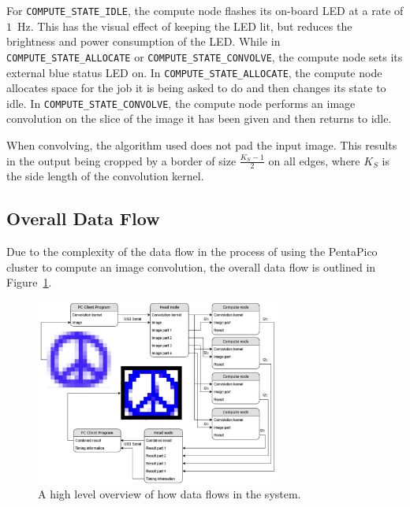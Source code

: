 \documentclass[conference]{IEEEtran}
\begin{document}
For \texttt{COMPUTE\_STATE\_IDLE}, the compute node flashes its on-board LED at a rate of $1$~Hz. This has the visual effect of keeping the LED lit, but reduces the brightness and power consumption of the LED.
While in \texttt{COMPUTE\_STATE\_ALLOCATE} or \texttt{COMPUTE\_STATE\_CONVOLVE}, the compute node sets its external blue status LED on.
In \texttt{COMPUTE\_STATE\_ALLOCATE}, the compute node allocates space for the job it is being asked to do and then changes its state to idle.
In \texttt{COMPUTE\_STATE\_CONVOLVE}, the compute node performs an image convolution on the slice of the image it has been given and then returns to idle.

When convolving, the algorithm used does not pad the input image.
This results in the output being cropped by a border of size $\frac{K_S-1}{2}$ on all edges, where $K_S$ is the side length of the convolution kernel.

\subsection{Overall Data Flow}

Due to the complexity of the data flow in the process of using the PentaPico cluster to compute an image convolution, the overall data flow is outlined in Figure~\ref{data_flow_figure}.

\begin{figure}[ht]
\includegraphics[width=8cm]{dataflow.png}
\caption{A high level overview of how data flows in the system.}
\label{data_flow_figure}
\end{figure}
\end{document}
